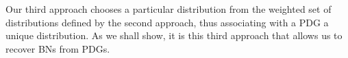 \documentclass{article}
\newcommand{\commentout}[1]{\ignorespaces}
\newcommand{\MN}{PDG}
\numberwithin{equation}{section}
\begin{document}
	Our third approach chooses a particular distribution from the weighted set of distributions defined by the second 	approach, thus associating with a PDG a unique distribution. As we shall show, it is this third approach that allows us to recover BNs from PDGs. 
\end{document}
